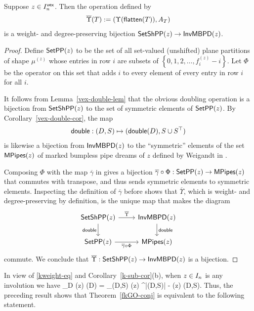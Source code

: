\documentclass[10pt]{article}
\begin{document}
\begin{theorem}
\label{upsilon-thm}
Suppose $z \in I^{\mathsf{vex}}_n$.
Then the operation defined by 
\[
\overline{\Upsilon}(T) := ( \Upsilon(\mathsf{flatten}(T)) , A_T)
\]
is a weight- and degree-preserving bijection $  \mathsf{SetShPP}(z) \to \mathsf{InvMBPD}(z)$.
\end{theorem}

\begin{proof}
Define
$\mathsf{SetPP}(z)$ to be the set of all set-valued (unshifted) plane partitions of shape $\mu^{(z)}$ whose entries in row $i$ are subsets of $\left\{0,1,2,\dots,f^{(z)}_i-i\right\}$.
Let $\Phi$ be the operator on this set that adds $i$ to every element of every entry in row $i$ for all $i$.

It follows from Lemma~\ref{vex-double-lem} that the obvious doubling operation is a bijection
from $\mathsf{SetShPP}(z)$ to the set of symmetric elements of $\mathsf{SetPP}(z)$.
By Corollary~\ref{vex-double-cor}, the map
\[
\mathsf{double} : (D,S) \mapsto (\mathsf{double}(D), S\cup S^\top)
\]
is likewise a bijection from $\mathsf{InvMBPD}(z)$ to the ``symmetric'' elements of the set $\mathsf{MPipes}(z)$ of
marked bumpless pipe dreams of $z$ defined by Weigandt  in \cite[\S1.2]{Weigandt}.

Composing $\Phi$ with the map $\overline{\gamma}$ in \cite[Thm.~1.6]{Weigandt}
gives a bijection $\overline{\gamma}\circ \Phi :\mathsf{SetPP}(z) \to \mathsf{MPipes}(z)$ that commutes with transpose, and thus sends symmetric elements to symmetric elements.
Inspecting the definition of $\overline{\gamma}$ before \cite[Lem.~7.8]{Weigandt} 
shows that  $\overline{\Upsilon}$, which is weight- and degree-preserving by definition,  is the unique map that makes the diagram
\[
\begin{tikzcd}
\SetSPP(z) \arrow[r, "\overline{\Upsilon}"] \arrow[d, "\double"'] & \MInvBPD(z) \arrow[d, "\double"] \\
\SetPP(z) \arrow[r, "\overline{\gamma}\circ \Phi"']                 & \MPipes(z)
\end{tikzcd}
\]
commute. We conclude that  $\overline{\Upsilon} : \mathsf{SetShPP}(z) \to \mathsf{InvMBPD}(z)$ is a bijection.
\end{proof}

In view of \eqref{kweight-eq} and Corollary~\ref{k-sub-cor}(b),
 when $z \in I_n$ is any involution we have  
\be\label{fkGO-conj-eq}
\textstyle \sum_{D \in \InvBPD(z)} \kweight(D) = \sum_{(D,S) \in \MInvBPD(z)} \beta^{|(D,S)| - \ellinv(z)}  \kweight(D,S).\ee
Thus, the preceding result shows that Theorem~\ref{fkGO-conj} is equivalent to the following statement.
\end{document}
